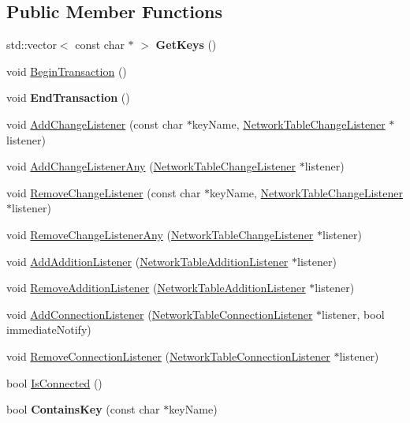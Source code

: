 \subsection*{Public Member Functions}
\begin{DoxyCompactItemize}
\item 
\hypertarget{classNetworkTable_a2582187d27e5d4b179c7f8609bfd6966}{
std::vector$<$ const char $\ast$ $>$ {\bfseries GetKeys} ()}
\label{classNetworkTable_a2582187d27e5d4b179c7f8609bfd6966}

\item 
void \hyperlink{classNetworkTable_aad62de896f38d7685debeec344443bf9}{BeginTransaction} ()
\item 
\hypertarget{classNetworkTable_a27054ba709b7e14f9133b9f7452bb111}{
void {\bfseries EndTransaction} ()}
\label{classNetworkTable_a27054ba709b7e14f9133b9f7452bb111}

\item 
void \hyperlink{classNetworkTable_a4299ab2f82343a10d383d124e48b7fd7}{AddChangeListener} (const char $\ast$keyName, \hyperlink{classNetworkTableChangeListener}{NetworkTableChangeListener} $\ast$listener)
\item 
void \hyperlink{classNetworkTable_a4ddce7fe697fc353f29081be309b70f0}{AddChangeListenerAny} (\hyperlink{classNetworkTableChangeListener}{NetworkTableChangeListener} $\ast$listener)
\item 
void \hyperlink{classNetworkTable_a4d5550ae57067f0719fc70b079fb37f2}{RemoveChangeListener} (const char $\ast$keyName, \hyperlink{classNetworkTableChangeListener}{NetworkTableChangeListener} $\ast$listener)
\item 
void \hyperlink{classNetworkTable_aba3ab188d07587e51dcdb64b0602ae72}{RemoveChangeListenerAny} (\hyperlink{classNetworkTableChangeListener}{NetworkTableChangeListener} $\ast$listener)
\item 
void \hyperlink{classNetworkTable_adfbdab51566db8de0aa13cf12a282a4f}{AddAdditionListener} (\hyperlink{classNetworkTableAdditionListener}{NetworkTableAdditionListener} $\ast$listener)
\item 
void \hyperlink{classNetworkTable_a6f4293d410e8530ebb6d510ed896a165}{RemoveAdditionListener} (\hyperlink{classNetworkTableAdditionListener}{NetworkTableAdditionListener} $\ast$listener)
\item 
void \hyperlink{classNetworkTable_ad4a248973f11e2cfba103ad1fec6d564}{AddConnectionListener} (\hyperlink{classNetworkTableConnectionListener}{NetworkTableConnectionListener} $\ast$listener, bool immediateNotify)
\item 
void \hyperlink{classNetworkTable_ac8a8666f2eef96064bb2c4a77d667f98}{RemoveConnectionListener} (\hyperlink{classNetworkTableConnectionListener}{NetworkTableConnectionListener} $\ast$listener)
\item 
bool \hyperlink{classNetworkTable_a9ff833b20c5734863225b05fff9d3cca}{IsConnected} ()
\item 
\hypertarget{classNetworkTable_ad98ee019e389b6b616767412b6dc20e7}{
bool {\bfseries ContainsKey} (const char $\ast$keyName)}
\label{classNetworkTable_ad98ee019e389b6b616767412b6dc20e7}


\end{DoxyCompactItemize}
